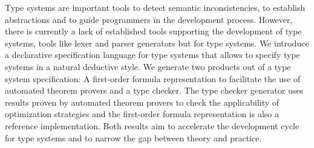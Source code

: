 Type systems are important tools to detect semantic inconsistencies,
to establish abstractions and to guide programmers in the development
process. However, there is currently a lack of established tools
supporting the development of type systems, tools like lexer and
parser generators but for type systems. We introduce a declarative
specification language for type systems that allows to specify type
systems in a natural deductive style. We generate two products out of
a type system specification: A first-order formula representation to
facilitate the use of automated theorem provers and a type
checker. The type checker generator uses results proven by automated
theorem provers to check the applicability of optimization strategies
and the first-order formula representation is also a reference
implementation. Both results aim to accelerate the development cycle
for type systems and to narrow the gap between theory and practice.

